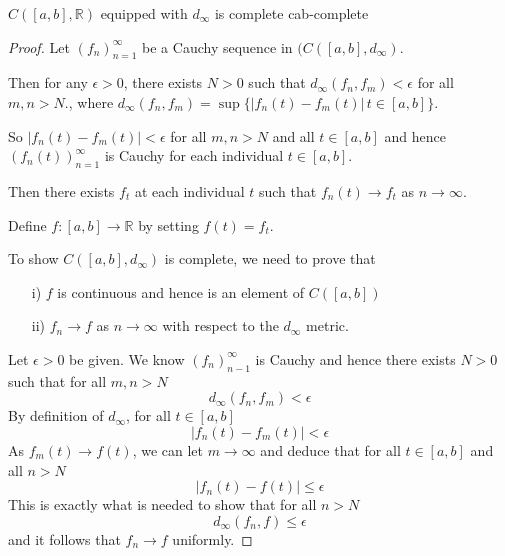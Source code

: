 \documentclass{article}
\numberwithin{equation}{section}
\numberwithin{figure}{section}
\begin{document}
\begin{theorem}{\texorpdfstring{$C([a,b],\mathbb{R})$ equipped with $d_\infty$}{The set of real continuous functions with a closed real domain equipped with the infinity metric } is complete }{cab-complete}
\begin{proof}
    Let $(f_n)^\infty_{n=1}$ be a Cauchy sequence in $(C([a,b], d_\infty)$.

    Then for any $\epsilon>0$, there exists $N>0$ such that $d_\infty(f_n, f_m)<\epsilon$ for all $m,n >N$., where $d_\infty(f_n,f_m)=\sup\{|f_n(t)-f_m(t)| \, t \in [a,b]\}$.

    So $|f_n(t)-f_m(t)| < \epsilon$ for all $m,n >N$ and all $t \in [a,b]$ and hence $(f_n(t))^\infty_{n=1}$ is Cauchy for each individual $t \in [a,b]$.

    Then there exists $f_t$ at each individual $t$ such that $f_n(t) \to f_t$ as $n \to \infty$.

    Define $f:[a,b] \to \mathbb{R}$ by setting $f(t) = f_t$.

    To show $C([a,b], d_\infty)$ is complete, we need to prove that
    \begin{itemize}
        \item[i)] $f$ is continuous and hence is an element of $C([a,b])$
        \item[ii)] $f_n \to f$ as $n \to \infty$ with respect to the $d_\infty$ metric.
    \end{itemize}
    Let $\epsilon>0$ be given. We know $(f_n)^\infty_{n-1}$ is Cauchy and hence there exists $N>0$ such that for all $m,n>N$ 
    \begin{equation}
        d_\infty(f_n, f_m)<\epsilon
    \end{equation}
    By definition of $d_\infty$, for all $t \in [a,b]$
    \begin{equation}
        |f_n(t)-f_m(t)| < \epsilon
    \end{equation}
    As $f_m(t)\to f(t)$, we can let $m \to \infty$ and deduce that for all $t \in [a,b]$ and all $n>N$
    \begin{equation}
        |f_n(t)-f(t)| \leq \epsilon
    \end{equation}
    This is exactly what is needed to show that for all $n>N$
    \begin{equation}
        d_\infty(f_n,f)\leq \epsilon
    \end{equation} 
    and it follows that $f_n \to f$ uniformly.


\end{proof}
\end{theorem}
\end{document}

